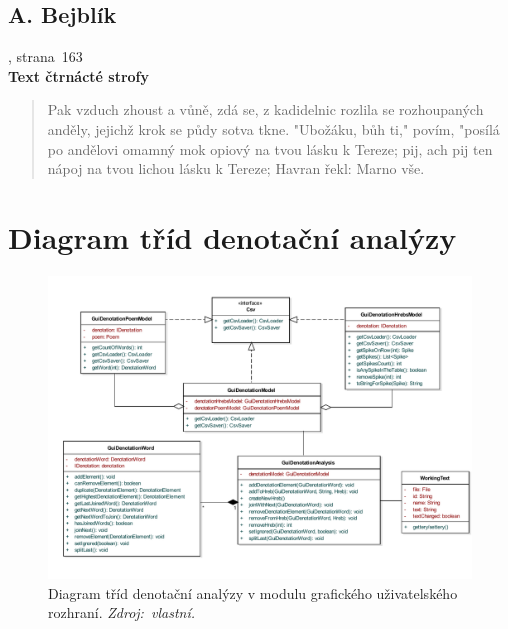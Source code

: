 \documentclass[dp.tex]{subfiles}
\begin{document}
\section*{A. Bejblík}
, strana~163
\\\textbf{Text čtrnácté strofy}
\begin{verse}
Pak vzduch zhoust a vůně, zdá se, z kadidelnic rozlila se
rozhoupaných anděly, jejichž krok se půdy sotva tkne.
"Ubožáku, bůh ti," povím, "posílá po andělovi
omamný mok opiový na tvou lásku k Tereze;
pij, ach pij ten nápoj na tvou lichou lásku k Tereze;
Havran řekl: Marno vše.
\end{verse}

\chapter{Diagram tříd denotační analýzy}
\label{appendix:class-diagram}

\begin{figure}[H]
	\centering
	\includegraphics[max width=\textwidth,keepaspectratio=true]{imgs-60-aplikace/gui-denotation-class-diagram}
	\caption[]{Diagram tříd denotační analýzy v modulu grafického uživatelského rozhraní. \textit{Zdroj:~vlastní.}}
	\label{fig:gui-denotation-class-diagram}
\end{figure}
\end{document}
